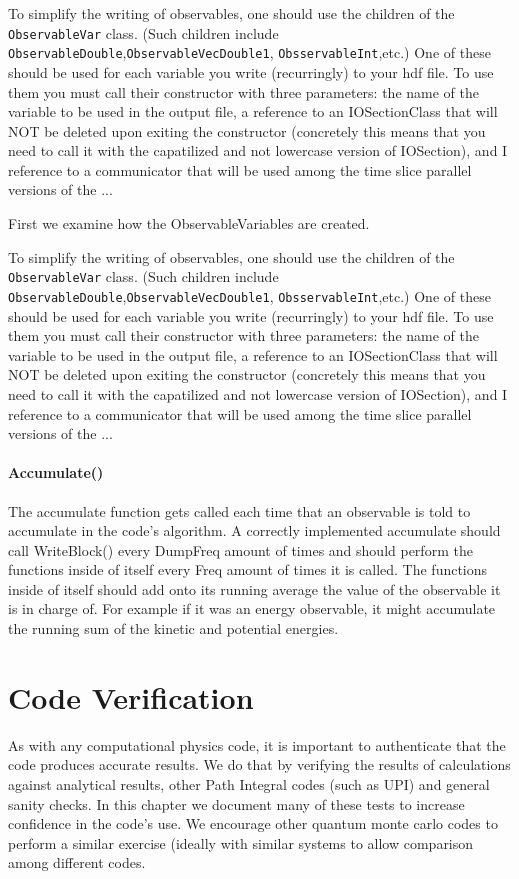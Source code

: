 \documentclass{book}
\begin{document}
To simplify the writing of observables, one should use 
the children of the \texttt{ObservableVar} class. (Such children include 
\texttt{ObservableDouble},\texttt{ObservableVecDouble1},
\texttt{ObsservableInt},etc.) One of these should be used for each
variable you write (recurringly) to your hdf file.  
To use them you must call their constructor with three parameters:
the name of the variable to be used in the output file, a reference to 
an IOSectionClass that will NOT be deleted upon exiting the constructor
(concretely this means that you need to call it with the capatilized and not
lowercase version of IOSection), and I reference to a communicator that 
will be used among the time slice parallel versions of the ...

First we examine how the ObservableVariables are created.


To simplify the writing of observables, one should use 
the children of the \texttt{ObservableVar} class. (Such children include 
\texttt{ObservableDouble},\texttt{ObservableVecDouble1},
\texttt{ObsservableInt},etc.) One of these should be used for each
variable you write (recurringly) to your hdf file.  
To use them you must call their constructor with three parameters:
the name of the variable to be used in the output file, a reference to 
an IOSectionClass that will NOT be deleted upon exiting the constructor
(concretely this means that you need to call it with the capatilized and not
lowercase version of IOSection), and I reference to a communicator that 
will be used among the time slice parallel versions of the ...


\subsubsection{Accumulate()}
The accumulate function gets called each time that an observable is
told to accumulate in the code's algorithm.  A correctly implemented
accumulate should call WriteBlock() every DumpFreq amount of times and
should perform the functions inside of itself every Freq amount of
times it is called.  The functions inside of itself should add onto
its running average the value of the observable it is in charge
of. For example if it was an energy observable, it might accumulate
the running sum of the kinetic and potential energies.


\chapter{Code Verification}
As with any computational physics code, it is important to
authenticate that the code produces accurate results. We do that by
verifying the results of calculations against analytical results,
other Path Integral codes (such as UPI) and general sanity checks. In
this chapter we document many of these tests to increase confidence in
the code's use.  We encourage other quantum monte carlo codes to
perform a similar exercise (ideally with similar systems to allow
comparison among different codes.
\end{document}
